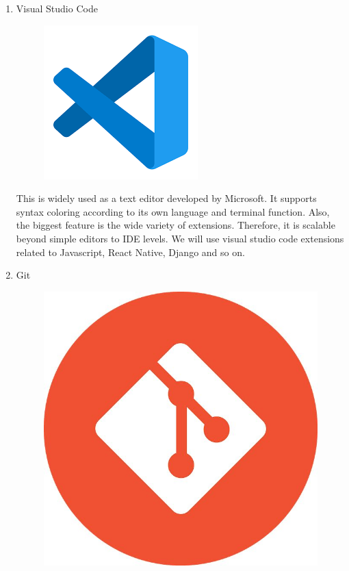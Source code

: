 \documentclass[conference]{IEEEtran}
\begin{document}
\begin{enumerate}
    \begin{enumerate}
        \item Visual Studio Code
        \begin{figure}[H]
                 \centering
                 \includegraphics[scale=0.3]{new_assets/vscode-logo.png}
                 \end{figure}
        This is widely used as a text editor developed by Microsoft. It supports syntax coloring according to its own language and terminal function. Also, the biggest feature is the wide variety of extensions. Therefore, it is scalable beyond simple editors to IDE levels. We will use visual studio code extensions related to Javascript, React Native, Django and so on.\\
        \item Git
        \begin{figure}[H]
                 \centering
                 \includegraphics[scale=0.1]{new_assets/git-logo.jpg}

\end{figure}
\end{enumerate}
\end{enumerate}
\end{document}
